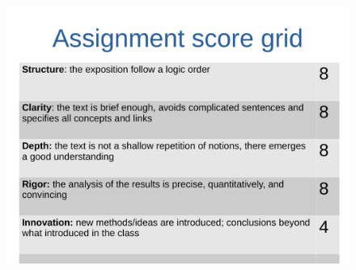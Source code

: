 \documentclass[prl,twocolumn]{revtex4-1}
\begin{document}
\clearpage

\begin{figure}[!tb]
  \centering
  \includegraphics[width=\textwidth]{description_assignment_LCPB_20-21.pdf}
\end{figure}
\end{document}
